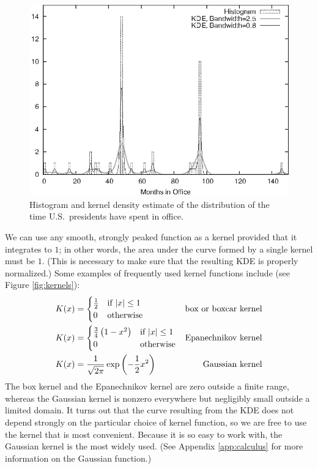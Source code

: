 \begin{figure}
  \centerline{\includegraphics{img/presidents-kde}}
  \caption{Histogram and kernel density estimate of the distribution
    of the time U.S.\ presidents have spent in office.}
  \label{fig:presidentskde}
\end{figure}\pagebreak

We can use any smooth, strongly peaked function as a kernel provided
that it integrates to $1$; in other words, the area under the curve
formed by a single kernel must be $1$. (This is necessary to make sure
that the resulting KDE is properly normalized.) Some examples of
frequently used kernel functions include (see Figure
\ref{fig:kernels}):
%
\begin{align*}
K(x) & = 
\begin{cases}
  \frac{1}{2} & \hbox{if $\lvert x \rvert \le 1$} \\
  0           & \hbox{otherwise}
\end{cases}
     & \hbox{box or boxcar kernel} \\
K(x) & = 
\begin{cases}
  \frac{3}{4} \left( 1-x^2 \right) & \hbox{if $\lvert x \rvert \le 1$} \\
  0                         & \hbox{otherwise}
\end{cases}
     & \hbox{Epanechnikov kernel} \\
K(x) & = \frac{1}{\sqrt{2 \pi}} \exp\left( - \frac{1}{2} x^2 \right)
     & \hbox{Gaussian kernel}
\end{align*}
%
The box kernel and the Epanechnikov kernel are zero outside a finite
range, whereas the Gaussian kernel  is nonzero everywhere but
negligibly small outside a limited domain. It turns out that the curve
resulting from the KDE does not depend strongly on the particular
choice of kernel function, so we are free to use the kernel that is
most convenient.  Because it is so easy to work with, the Gaussian
kernel is the most widely used. (See Appendix \ref{app:calculus} for
more information on the Gaussian function.)

